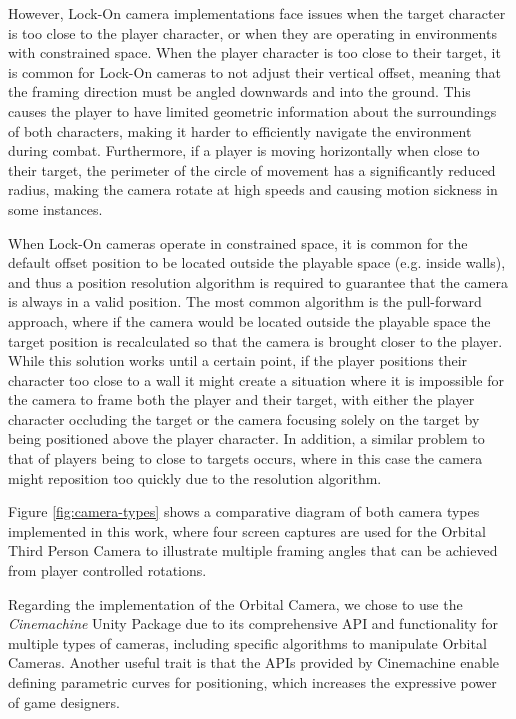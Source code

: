 However, Lock-On camera implementations face issues when the target character is too close to the player character, or when they are operating in environments with constrained space. When the player character is too close to their target, it is common for Lock-On cameras to not adjust their vertical offset, meaning that the framing direction must be angled downwards and into the ground. This causes the player to have limited geometric information about the surroundings of both characters, making it harder to efficiently navigate the environment during combat. Furthermore, if a player is moving horizontally when close to their target, the perimeter of the circle of movement has a significantly reduced radius, making the camera rotate at high speeds and causing motion sickness in some instances.

When Lock-On cameras operate in constrained space, it is common for the default offset position to be located outside the playable space (e.g. inside walls), and thus a position resolution algorithm is required to guarantee that the camera is always in a valid position. The most common algorithm is the pull-forward approach, where if the camera would be located outside the playable space the target position is recalculated so that the camera is brought closer to the player. While this solution works until a certain point, if the player positions their character too close to a wall it might create a situation where it is impossible for the camera to frame both the player and their target, with either the player character occluding the target or the camera focusing solely on the target by being positioned above the player character. In addition, a similar problem to that of players being to close to targets occurs, where in this case the camera might reposition too quickly due to the resolution algorithm.

Figure \ref{fig:camera-types} shows a comparative diagram of both camera types implemented in this work, where four screen captures are used for the Orbital Third Person Camera to illustrate multiple framing angles that can be achieved from player controlled rotations.



Regarding the implementation of the Orbital Camera, we chose to use the \emph{Cinemachine} Unity Package due to its comprehensive API and functionality for multiple types of cameras, including specific algorithms to manipulate Orbital Cameras. Another useful trait is that the APIs provided by Cinemachine enable defining parametric curves for positioning, which increases the expressive power of game designers.


